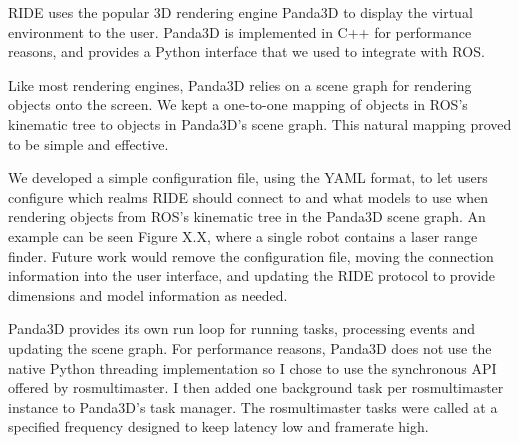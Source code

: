 RIDE uses the popular 3D rendering engine Panda3D to display the virtual environment to the user. Panda3D is implemented in C++ for performance reasons, and provides a Python interface that we used to integrate with ROS. 

Like most rendering engines, Panda3D relies on a scene graph for rendering objects onto the screen. We kept a one-to-one mapping of objects in ROS's kinematic tree to objects in Panda3D's scene graph. This natural mapping proved to be simple and effective.

We developed a simple configuration file, using the YAML format, to let users configure which realms RIDE should connect to and what models to use when rendering objects from ROS's kinematic tree in the Panda3D scene graph. An example can be seen Figure X.X, where a single robot contains a laser range finder. Future work would remove the configuration file, moving the connection information into the user interface, and updating the RIDE protocol to provide dimensions and model information as needed.


Panda3D provides its own run loop for running tasks, processing events and updating the scene graph. For performance reasons, Panda3D does not use the native Python threading implementation so I chose to use the synchronous API offered by rosmultimaster. I then added one background task per rosmultimaster instance to Panda3D's task manager. The rosmultimaster tasks were called at a specified frequency designed to keep latency low and framerate high.
